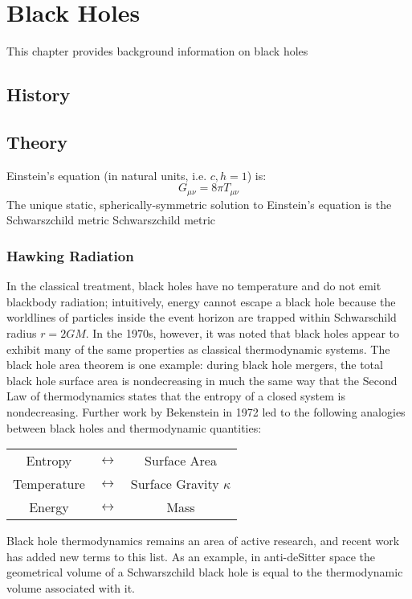 \chapter[Black Holes]{Black Holes}\label{chapter:pbhs}
This chapter provides background information on black holes

\section{History}

\section{Theory}
Einstein's equation (in natural units, i.e. $c, h = 1$) is:
\begin{equation}
G_{\mu\nu} = 8\pi T_{\mu\nu}
\end{equation}
The unique static, spherically-symmetric solution to Einstein's equation is the Schwarszchild metric
Schwarszchild metric
\subsection{Hawking Radiation}
In the classical treatment, black holes have no temperature and do not emit blackbody radiation; intuitively, energy cannot escape a black hole because the worldlines of particles inside the event horizon are trapped within Schwarschild radius $r=2GM$. 
In the 1970s, however, it was noted that black holes appear to exhibit many of the same properties as classical thermodynamic systems.
The black hole area theorem is one example: during black hole mergers, the total black hole surface area is nondecreasing in much the same way that the Second Law of thermodynamics states that the entropy of a closed system is nondecreasing.
Further work by Bekenstein in 1972 led to the following analogies between black holes and thermodynamic quantities:
\begin{center}
\begin{tabular}{ccc}
Entropy & $\longleftrightarrow$ & Surface Area\\
Temperature & $\longleftrightarrow$ & Surface Gravity $\kappa$\\
Energy & $\longleftrightarrow$  & Mass\\
\end{tabular}
\end{center}
Black hole thermodynamics remains an area of active research, and recent work has added new terms to this list.
As an example, in anti-deSitter space the geometrical volume of a Schwarszchild black hole is equal to the thermodynamic volume associated with it.


